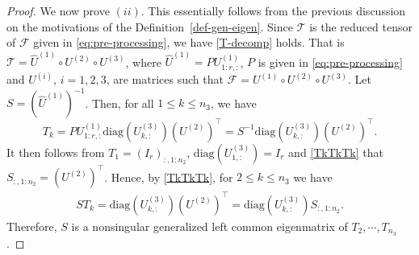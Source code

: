 \documentclass[10pt,a4paper]{amsart}
\renewcommand{\hat}{\widehat}
\begin{document}
\begin{proof}
We now prove $(ii)$. 
This essentially follows from the previous discussion on the motivations of the Definition~\ref{def-gen-eigen}.
Since $\mathcal{T}$ is the reduced tensor of $\mathcal{F}$ given in \eqref{eq:pre-processing}, we have \eqref{T-decomp} holds. That is 
$\mathcal{T} = \hat{U}^{(1)} \circ U^{(2)} \circ U^{(3)}$, 
where $\hat{U}^{(1)} = PU^{(1)}_{1:r,:}$, $P$ is given in \eqref{eq:pre-processing}
and $ U^{(i)} $, $i=1,2,3$, are matrices such that 
$\mathcal{F} = U^{(1)} \circ U^{(2)} \circ U^{(3)}$.
Let $S = (\hat{U}^{(1)})^{-1}$.
Then, for all $1 \leq k \leq n_3$, we have
\begin{equation}\label{TkTkTk}
T_k= PU^{(1)}_{1:r,:} \text{diag}(U^{(3)}_{k,:})({U}^{(2)})^\top=S^{-1} \text{diag}(U^{(3)}_{k,:})({U}^{(2)})^\top.
\end{equation}
It then follows from  $T_1=(I_r)_{:,1:n_2} $,  
$\mathrm{diag}(U^{(3)}_{1,:}) = I_r$ and \eqref{TkTkTk} that $S_{:,1:n_2} =  (U^{(2)})^\top$.
Hence, by  \eqref{TkTkTk}, for $2 \leq k \leq n_3$ we have
\begin{align}
    S T_k = \text{diag}(U^{(3)}_{k,:})({U}^{(2)})^\top= \text{diag}(U^{(3)}_{k,:}) S_{:,1:n_2}.
\end{align}
Therefore, $S$ is a nonsingular generalized left common eigenmatrix of 
$T_2,\cdots,T_{n_3}$.
\end{proof}
\end{document}
